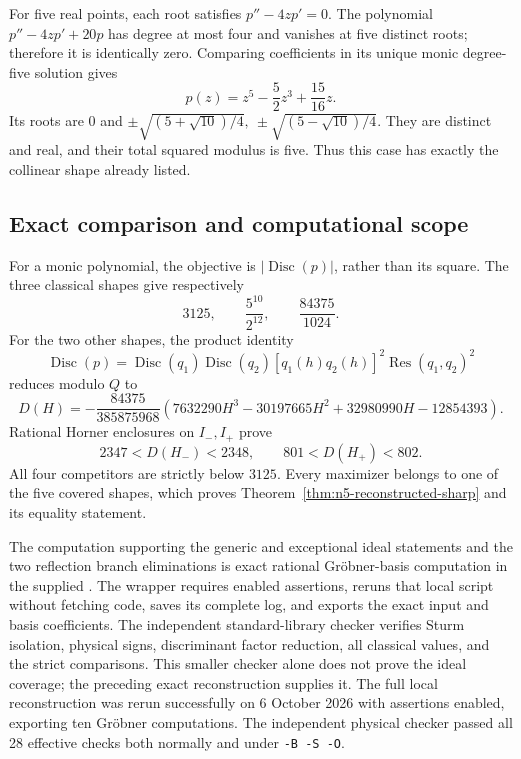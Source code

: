 \documentclass[11pt]{article}
\theoremstyle{remark}
\numberwithin{equation}{section}
\begin{document}
For five real points, each root satisfies $p''-4zp'=0$.
The polynomial $p''-4zp'+20p$ has degree at most four and vanishes
at five distinct roots; therefore it is identically zero. Comparing
coefficients in its unique monic degree-five solution gives
\[
 p(z)=z^5-\frac52z^3+\frac{15}{16}z.
\]
Its roots are $0$ and
$\pm\sqrt{(5+\sqrt{10})/4},\ \pm\sqrt{(5-\sqrt{10})/4}$.
They are distinct and real, and their total squared modulus is five.
Thus this case has exactly the collinear shape already listed.

\subsection{Exact comparison and computational scope}
For a monic polynomial, the objective is
$|\operatorname{Disc}(p)|$, rather than its square. The three
classical shapes give respectively
\[
 3125,\qquad \frac{5^{10}}{2^{12}},\qquad \frac{84375}{1024}.
\]
For the two other shapes, the product identity
\[
 \operatorname{Disc}(p)=
 \operatorname{Disc}(q_1)\operatorname{Disc}(q_2)
 [q_1(h)q_2(h)]^2\operatorname{Res}(q_1,q_2)^2
\]
reduces modulo $Q$ to
\[
 D(H)=-\frac{84375}{385875968}
       (7632290H^3-30197665H^2+32980990H-12854393).
\]
Rational Horner enclosures on $I_-,I_+$ prove
\[
 2347<D(H_-)<2348,\qquad 801<D(H_+)<802.
\]
All four competitors are strictly below $3125$. Every maximizer
belongs to one of the five covered shapes, which proves
Theorem~\ref{thm:n5-reconstructed-sharp} and its equality statement.

The computation supporting the generic and exceptional ideal statements
and the two reflection branch eliminations is exact rational
Gr\"obner-basis computation in the supplied
. The wrapper
 requires enabled assertions, reruns that
local script without fetching code, saves its complete log, and exports
the exact input and basis coefficients. The independent standard-library
checker  verifies Sturm isolation,
physical signs, discriminant factor reduction, all classical values,
and the strict comparisons. This smaller checker alone does not prove
the ideal coverage; the preceding exact reconstruction supplies it.
The full local reconstruction was rerun successfully on 6 October 2026
with assertions enabled, exporting ten Gr\"obner computations. The
independent physical checker passed all 28 effective checks both normally
and under \texttt{-B -S -O}.
\end{document}
